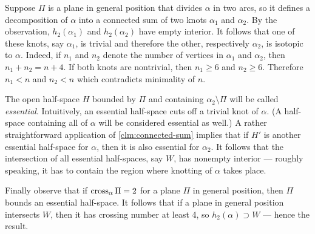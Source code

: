 Suppose $\Pi$ is a plane in general position that divides $\alpha$ in two arcs, so it defines a decomposition of $\alpha$ into a connected sum of two knots $\alpha_1$ and $\alpha_2$.
By the observation, $h_2(\alpha_1)$ and $h_2(\alpha_2)$ have empty interior.
It follows that one of these knots, say $\alpha_1$, is trivial and therefore the other, respectively $\alpha_2$, is isotopic to $\alpha$.
Indeed, if $n_1$ and $n_2$ denote the number of vertices in $\alpha_1$ and $\alpha_2$, then $n_1+n_2=n+4$. 
If both knots are nontrivial, then $n_1\ge 6$ and $n_2\ge 6$.
Therefore $n_1<n$ and $n_2<n$ which contradicts minimality of $n$.

The open half-space $H$ bounded by $\Pi$ and containing $\alpha_2\setminus\Pi$ will be called \emph{essential}. Intuitively, an essential half-space cuts off
a trivial knot of $\alpha$. (A half-space containing all of $\alpha$ will be considered essential as well.)
A rather straightforward application of \ref{clm:connected-sum} implies that if $H'$ is another essential half-space for $\alpha$, then it is also essential for $\alpha_2$.
It follows that the intersection of all essential half-spaces, say $W$, has nonempty interior --- roughly speaking, it has to contain the region where knotting of $\alpha$ takes place.

Finally observe that if $\mathop{\rm cross}\nolimits_\alpha\Pi=2$ for a plane $\Pi$ in general position, then $\Pi$ bounds an essential half-space. 
It follows that if a plane in general position intersects $W$, then it has  crossing number at least 4,
so $h_2(\alpha)\supset W$ --- hence the result.
\qeds

